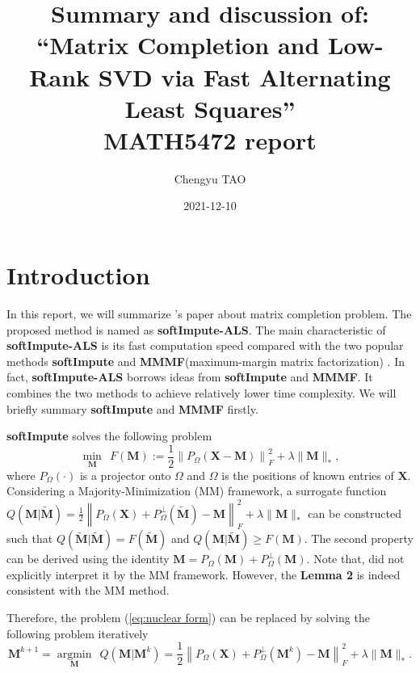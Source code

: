 \documentclass[11pt]{article}
\title{Summary and discussion of: ``Matrix Completion and Low-Rank SVD via
	Fast Alternating Least Squares''\\
\large{MATH5472 report} }
\author{Chengyu TAO}
\date{2021-12-10}
\begin{document}
\maketitle
\section{Introduction}
In this report, we will summarize \cite{hastie2015matrix}'s paper about matrix completion problem. The proposed method is named as \textbf{softImpute-ALS}. The main characteristic of \textbf{softImpute-ALS} is its fast computation speed compared with the two popular methods  \textbf{softImpute} \citep{mazumder2010spectral} and \textbf{ MMMF}(maximum-margin matrix factorization) \citep{srebro2004maximum}. In fact, \textbf{softImpute-ALS} borrows ideas from \textbf{softImpute} and \textbf{ MMMF}. It combines the two methods to achieve relatively lower time complexity. We will briefly summary \textbf{softImpute} and \textbf{MMMF} firstly.

\textbf{softImpute} solves the following problem
\begin{equation}
\underset{\boldsymbol{M}}{\operatorname{min}} \ \ F(\boldsymbol{M}):=\frac{1}{2}\left\|P_{\Omega}(\boldsymbol{X}-\boldsymbol{M})\right\|_{F}^{2}+\lambda\|\boldsymbol{M}\|_{*},
\label{eq:nuclear form}
\end{equation}
where $P_{\Omega}(\cdot)$ is a projector onto $\Omega$ and $\Omega$ is the positions of known entries of $\boldsymbol{X}$. Considering a Majority-Minimization (MM) framework, a surrogate function $Q(\boldsymbol{M}| \tilde{\boldsymbol{M}})=\frac{1}{2}\left\|P_{\Omega}(\boldsymbol{X})+P_{\Omega}^{\perp}(\tilde{\boldsymbol{M}})-\boldsymbol{M}\right\|_{F}^{2}+\lambda\|\boldsymbol{M}\|_{*}$ can be constructed such that $Q(\tilde{\boldsymbol{M}}|\tilde{\boldsymbol{M}})=F(\tilde{\boldsymbol{M}})$ and $Q(\boldsymbol{M}|\tilde{\boldsymbol{M}})\geq F(\boldsymbol{M})$. The second property can be derived using the identity $\boldsymbol{M}=P_{\Omega}(\boldsymbol{M})+P_{\Omega}^{\perp}(\boldsymbol{M})$. Note that, \cite{mazumder2010spectral} did not explicitly interpret it by the MM framework. However, the \textbf{Lemma 2} \citep{mazumder2010spectral} is indeed consistent with the MM method.  

Therefore, the  problem (\ref{eq:nuclear form}) can be replaced by solving the following problem iteratively
\begin{equation}
\boldsymbol{M}^{k+1} =\underset{\boldsymbol{M}}{\operatorname{argmin}} \ \ Q(\boldsymbol{M}|\boldsymbol{M}^k)=\frac{1}{2}\left\|P_{\Omega}(\boldsymbol{X})+P_{\Omega}^{\perp}(\boldsymbol{M}^k)-\boldsymbol{M}\right\|_{F}^{2}+\lambda\|\boldsymbol{M}\|_{*}.
\label{eq:softimpute}
\end{equation}
\end{document}
